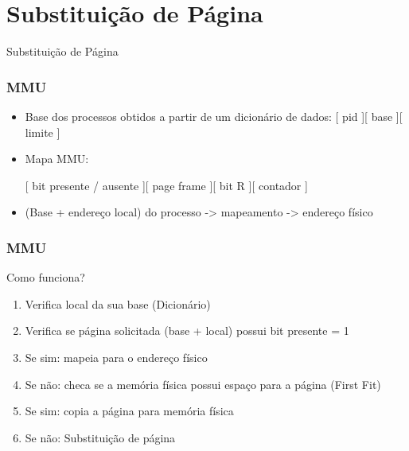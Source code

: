 \documentclass{beamer}
\begin{document}
\section{Substituição de Página}
\begin{frame}
\begin{LARGE}
\begin{center}
Substituição de Página
\end{center}
\end{LARGE}
\end{frame}

\begin{frame}
\frametitle{MMU}
\begin{itemize}

\item Base dos processos obtidos a partir de um dicionário de dados: [ pid ][ base ][ limite ]


\item Mapa MMU: 
 
[ bit presente / ausente ][ page frame ][ bit R ][ contador ]

\item (Base + endereço local) do processo -> mapeamento -> endereço físico

\end{itemize}
\justifying
\end{frame}

\begin{frame}
\frametitle{MMU}
Como funciona?
\begin{enumerate}

\item Verifica local da sua base (Dicionário)

\item Verifica se página solicitada (base + local) possui bit presente = 1

\item Se sim: mapeia para o endereço físico

\item Se não:  checa se a memória física possui espaço para a página (First Fit)

\item Se sim: copia a página para memória física

\item Se não: Substituição de página

\end{enumerate}
\justifying
\end{frame}
\end{document}
